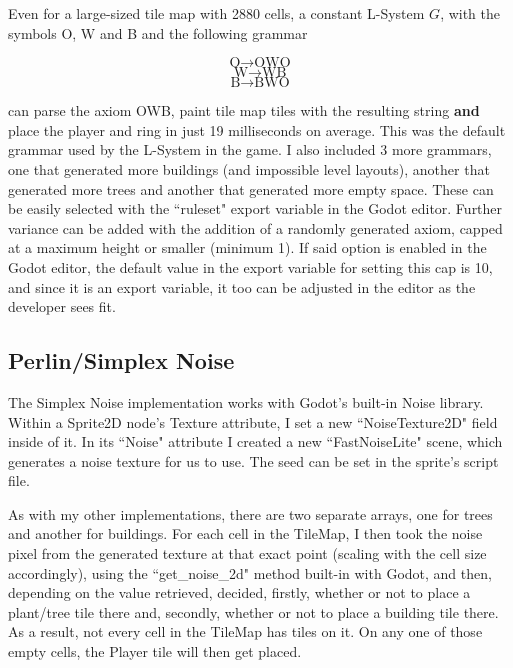 Even for a large-sized tile map with 2880 cells, a constant L-System $G$, with the symbols O, W and B and the following grammar

$$ \mbox{O} \rightarrow \mbox{O}\mbox{W}\mbox{O} $$
$$ \mbox{W} \rightarrow \mbox{W}\mbox{B} $$
$$ \mbox{B} \rightarrow \mbox{B}\mbox{W}\mbox{O} $$

can parse the axiom OWB, paint tile map tiles with the resulting string \textbf{and} place the player and ring in just 19 milliseconds on average. This was the default grammar used by the L-System in the game. I also included 3 more grammars, one that generated more buildings (and impossible level layouts), another that generated more trees and another that generated more empty space. These can be easily selected with the ``ruleset" export variable in the Godot editor. Further variance can be added with the addition of a randomly generated axiom, capped at a maximum height or smaller (minimum 1). If said option is enabled in the Godot editor, the default value in the export variable for setting this cap is 10, and since it is an export variable, it too can be adjusted in the editor as the developer sees fit.

\subsection{Perlin/Simplex Noise} \label{impperlin1}

The Simplex Noise implementation works with Godot's built-in Noise library. Within a Sprite2D node's Texture attribute, I set a new ``NoiseTexture2D" field inside of it. In its ``Noise" attribute I created a new ``FastNoiseLite" scene, which generates a noise texture for us to use. The seed can be set in the sprite's script file.

As with my other implementations, there are two separate arrays, one for trees and another for buildings. For each cell in the TileMap, I then took the noise pixel from the generated texture at that exact point (scaling with the cell size accordingly), using the ``get\_noise\_2d" method built-in with Godot, and then, depending on the value retrieved, decided, firstly, whether or not to place a plant/tree tile there and, secondly, whether or not to place a building tile there. As a result, not every cell in the TileMap has tiles on it. On any one of those empty cells, the Player tile will then get placed.

